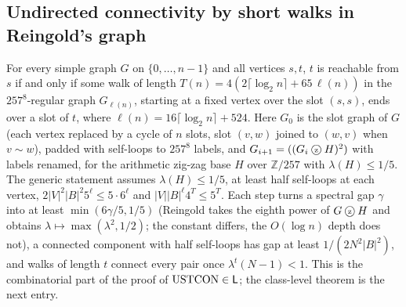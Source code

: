 \begin{result}
\subsection{Undirected connectivity by short walks in Reingold's graph}
For every simple graph $G$ on $\{0,\dots,n-1\}$ and all vertices $s,t$, $t$ is reachable from $s$
if and only if some walk of length $T(n)=4(2\lceil\log_2 n\rceil+65\,\ell(n))$ in the
$257^8$-regular graph $G_{\ell(n)}$, starting at a fixed vertex over the slot $(s,s)$, ends over a
slot of $t$, where $\ell(n)=16\lceil\log_2 n\rceil+524$. Here $G_0$ is the slot graph of $G$ (each
vertex replaced by a cycle of $n$ slots, slot $(v,w)$ joined to $(w,v)$ when $v\sim w$), padded
with self-loops to $257^8$ labels, and $G_{i+1}=((G_i\mathbin{\mbox{\textcircled{\scriptsize z}}}H)^2)$ with labels renamed, for
the arithmetic zig-zag base $H$ over $\mathbb{Z}/257$ with $\lambda(H)\le 1/5$. The generic
statement assumes $\lambda(H)\le1/5$, at least half self-loops at each vertex,
$2|V|^2|B|^2 5^\ell\le 5\cdot 6^\ell$ and $|V||B|^\ell 4^T\le 5^T$. Each step turns a spectral gap
$\gamma$ into at least $\min(6\gamma/5,1/5)$ (Reingold takes the eighth power of $G\mathbin{\mbox{\textcircled{\scriptsize z}}}H$
and obtains $\lambda\mapsto\max(\lambda^2,1/2)$; the constant differs, the $O(\log n)$ depth does
not), a connected component with half self-loops has gap at least $1/(2N^2|B|^2)$, and walks of
length $t$ connect every pair once $\lambda^t(N-1)<1$. This is the combinatorial part of the proof
of $\mathrm{USTCON}\in\mathsf{L}$; the class-level theorem is the next entry.\citep[Definition 3.1, Lemmas 3.2--3.3, Theorem 4.1]{Reingold2008}\citep[Section 21.4]{AroraBarak09}
\end{result}

